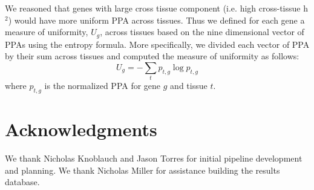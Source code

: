 \documentclass[10pt,letterpaper]{article}
\begin{document}
We reasoned that genes with large cross tissue component (i.e. high cross-tissue h$^2$) would have more uniform PPA across tissues. Thus we defined for each gene a measure of uniformity, $U_g$, across tissues based on the nine dimensional vector of PPAs using the entropy formula. More specifically, we divided each vector of PPA by their sum across tissues and computed the measure of uniformity as follows:
\[ U_g = -\sum_{t}p_{t,g} \log p_{t,g} \]
%
where \(p_{t,g}\) is the normalized PPA for gene $g$ and tissue $t$.




\section*{Acknowledgments}
We thank Nicholas Knoblauch and Jason Torres for initial pipeline
development and planning. We thank Nicholas Miller for assistance building
the results database.

%
\end{document}
